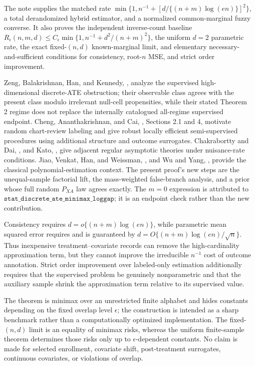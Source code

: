 The note supplies the matched rate \(\min\{1,n^{-1}+[d/\{(n+m)\log(en)\}]^2\}\), a total derandomized hybrid estimator, and a normalized common-marginal fuzzy converse.  It also proves the independent inverse-count baseline \(R_\epsilon(n,m,d)\le C_\epsilon\min\{1,n^{-1}+d^2/(n+m)^2\}\), the uniform \(d=2\) parametric rate, the exact fixed-\((n,d)\) known-marginal limit, and elementary necessary-and-sufficient conditions for consistency, root-\(n\) MSE, and strict order improvement.

Zeng, Balakrishnan, Han, and Kennedy, \cite{ZengBalakrishnanHanKennedy2024}, analyze the supervised high-dimensional discrete-ATE obstruction; their observable class agrees with the present class modulo irrelevant null-cell propensities, while their stated Theorem 2 regime does not replace the internally catalogued all-regime supervised endpoint.  Cheng, Ananthakrishnan, and Cai, \cite{ChengAnanthakrishnanCai2021}, Sections 2.1 and 4, motivate random chart-review labeling and give robust locally efficient semi-supervised procedures using additional structure and outcome surrogates.  Chakrabortty and Dai, \cite{ChakraborttyDai2024}, and Kato, \cite{Kato2025}, give adjacent regular asymptotic theories under nuisance-rate conditions.  Jiao, Venkat, Han, and Weissman, \cite{JiaoVenkatHanWeissman2015}, and Wu and Yang, \cite{WuYang2016}, provide the classical polynomial-estimation context.  The present proof's new steps are the unequal-sample factorial lift, the mass-weighted false-branch analysis, and a prior whose full random \(P_{XA}\) law agrees exactly.  The \(m=0\) expression is attributed to \(\texttt{stat\_discrete\_ate\_minimax\_loggap}\); it is an endpoint check rather than the new contribution.

Consistency requires \(d=o\{(n+m)\log(en)\}\), while parametric mean squared error requires and is guaranteed by \(d=O\{(n+m)\log(en)/\sqrt n\}\).  Thus inexpensive treatment--covariate records can remove the high-cardinality approximation term, but they cannot improve the irreducible \(n^{-1}\) cost of outcome annotation.  Strict order improvement over labeled-only estimation additionally requires that the supervised problem be genuinely nonparametric and that the auxiliary sample shrink the approximation term relative to its supervised value.

The theorem is minimax over an unrestricted finite alphabet and hides constants depending on the fixed overlap level \(\epsilon\); the construction is intended as a sharp benchmark rather than a computationally optimized implementation.  The fixed-\((n,d)\) limit is an equality of minimax risks, whereas the uniform finite-sample theorem determines those risks only up to \(\epsilon\)-dependent constants.  No claim is made for selected enrollment, covariate shift, post-treatment surrogates, continuous covariates, or violations of overlap.

